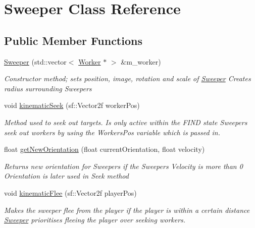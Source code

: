 \hypertarget{class_sweeper}{}\section{Sweeper Class Reference}
\label{class_sweeper}
\subsection*{Public Member Functions}
\begin{DoxyCompactItemize}
\item 
\mbox{\hyperlink{class_sweeper_a6c4ed469055d3da0b584bdbe32e4292a}{Sweeper}} (std\+::vector$<$ \mbox{\hyperlink{class_worker}{Worker}} $\ast$ $>$ \&m\+\_\+worker)
\begin{DoxyCompactList}\small\item\em Constructor method; sets position, image, rotation and scale of \mbox{\hyperlink{class_sweeper}{Sweeper}} Creates radius surrounding Sweepers \end{DoxyCompactList}\item 
void \mbox{\hyperlink{class_sweeper_a635c38dff02c5dcc73248b3359fdaee3}{kinematic\+Seek}} (sf\+::\+Vector2f worker\+Pos)
\begin{DoxyCompactList}\small\item\em Method used to seek out targets. Is only active within the F\+I\+ND state Sweepers seek out workers by using the Workers\+Pos variable which is passed in. \end{DoxyCompactList}\item 
float \mbox{\hyperlink{class_sweeper_a8bf97c85c79f5e2fef3c9822eb304596}{get\+New\+Orientation}} (float current\+Orientation, float velocity)
\begin{DoxyCompactList}\small\item\em Returns new orientation for Sweepers if the Sweepers Velocity is more than 0 Orientation is later used in Seek method \end{DoxyCompactList}\item 
void \mbox{\hyperlink{class_sweeper_ae240040aec3dd3f3c0082e5c614fab6d}{kinematic\+Flee}} (sf\+::\+Vector2f player\+Pos)
\begin{DoxyCompactList}\small\item\em Makes the sweeper flee from the player if the player is within a certain distance \mbox{\hyperlink{class_sweeper}{Sweeper}} prioritises fleeing the player over seeking workers. \end{DoxyCompactList}\item 

\end{DoxyCompactItemize}
